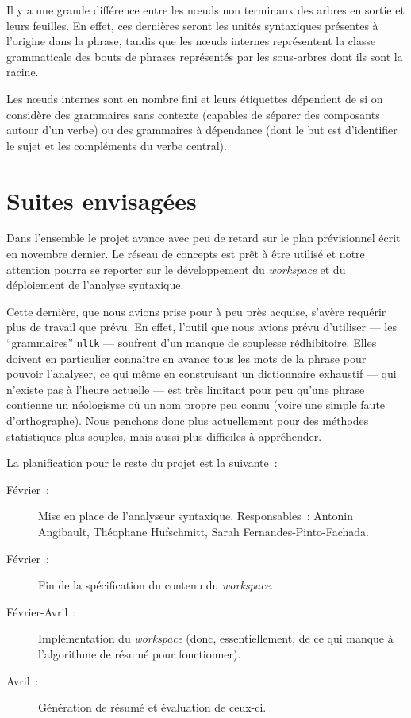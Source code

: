 \documentclass[a4paper, 12pt]{article}
\newcommand{\pyt}[1]{\texttt{#1}}%
\begin{document}
Il y a une grande différence entre les n\oe{}uds non terminaux des arbres en sortie et leurs feuilles. En effet, ces dernières seront les unités syntaxiques présentes à l'origine dans la phrase, tandis que les n\oe{}uds internes représentent la classe grammaticale des bouts de phrases représentés par les sous-arbres dont ils sont la racine.


Les n\oe{}uds internes sont en nombre fini et leurs étiquettes dépendent de si on considère des grammaires sans contexte (capables de séparer des composants autour d'un verbe) ou des grammaires à dépendance (dont le but est d'identifier le sujet et les compléments du verbe central).


\section{Suites envisagées}

Dans l'ensemble le projet avance avec peu de retard sur le plan prévisionnel écrit en novembre dernier. Le réseau de concepts est prêt à être utilisé et notre attention pourra se reporter sur le développement du \textit{workspace} et du déploiement de l'analyse syntaxique.

Cette dernière, que nous avions prise pour à peu près acquise, s'avère requérir plus de travail que prévu. En effet, l'outil que nous avions prévu d'utiliser --- les ``grammaires'' \pyt{nltk} --- soufrent d'un manque de souplesse rédhibitoire. Elles doivent en particulier connaître en avance tous les mots de la phrase pour pouvoir l'analyser, ce qui même en construisant un dictionnaire exhaustif --- qui n'existe pas à l'heure actuelle --- est très limitant pour peu qu'une phrase contienne un néologisme où un nom propre peu connu (voire une simple faute d'orthographe). Nous penchons donc plus actuellement pour des méthodes statistiques plus souples, mais aussi plus difficiles à appréhender.

\vspace{1\baselineskip}

La planification pour le reste du projet est la suivante~:
\begin{description}
	\item[Février~: ]Mise en place de l'analyseur syntaxique. Responsables~: Antonin Angibault, Théophane Hufschmitt, Sarah Fernandes-Pinto-Fachada.
	\item[Février~: ]Fin de la spécification du contenu du \textit{workspace}.
	\item[Février-Avril~: ]Implémentation du \textit{workspace} (donc, essentiellement, de ce qui manque à l'algorithme de résumé pour fonctionner).
	\item[Avril~: ]Génération de résumé et évaluation de ceux-ci.
\end{description}
\end{document}
